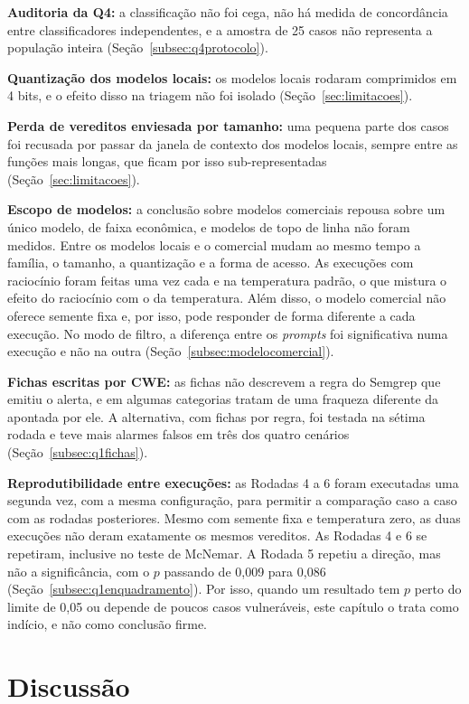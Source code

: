 \textbf{Auditoria da Q4:} a classificação não foi cega, não há medida de concordância entre classificadores independentes, e a amostra de 25 casos não representa a população inteira (Seção~\ref{subsec:q4protocolo}).

\textbf{Quantização dos modelos locais:} os modelos locais rodaram comprimidos em 4 bits, e o efeito disso na triagem não foi isolado (Seção~\ref{sec:limitacoes}).

\textbf{Perda de vereditos enviesada por tamanho:} uma pequena parte dos casos foi recusada por passar da janela de contexto dos modelos locais, sempre entre as funções mais longas, que ficam por isso sub-representadas (Seção~\ref{sec:limitacoes}).

\textbf{Escopo de modelos:} a conclusão sobre modelos comerciais repousa sobre um único modelo, de faixa econômica, e modelos de topo de linha não foram medidos. Entre os modelos locais e o comercial mudam ao mesmo tempo a família, o tamanho, a quantização e a forma de acesso. As execuções com raciocínio foram feitas uma vez cada e na temperatura padrão, o que mistura o efeito do raciocínio com o da temperatura. Além disso, o modelo comercial não oferece semente fixa e, por isso, pode responder de forma diferente a cada execução. No modo de filtro, a diferença entre os \textit{prompts} foi significativa numa execução e não na outra (Seção~\ref{subsec:modelocomercial}).

\textbf{Fichas escritas por CWE:} as fichas não descrevem a regra do Semgrep que emitiu o alerta, e em algumas categorias tratam de uma fraqueza diferente da apontada por ele. A alternativa, com fichas por regra, foi testada na sétima rodada e teve mais alarmes falsos em três dos quatro cenários (Seção~\ref{subsec:q1fichas}).

\textbf{Reprodutibilidade entre execuções:} as Rodadas 4 a 6 foram executadas uma segunda vez, com a mesma configuração, para permitir a comparação caso a caso com as rodadas posteriores. Mesmo com semente fixa e temperatura zero, as duas execuções não deram exatamente os mesmos vereditos. As Rodadas 4 e 6 se repetiram, inclusive no teste de McNemar. A Rodada 5 repetiu a direção, mas não a significância, com o $p$ passando de 0,009 para 0,086 (Seção~\ref{subsec:q1enquadramento}). Por isso, quando um resultado tem $p$ perto do limite de 0,05 ou depende de poucos casos vulneráveis, este capítulo o trata como indício, e não como conclusão firme.

\section{Discussão}
\label{sec:discussao}

